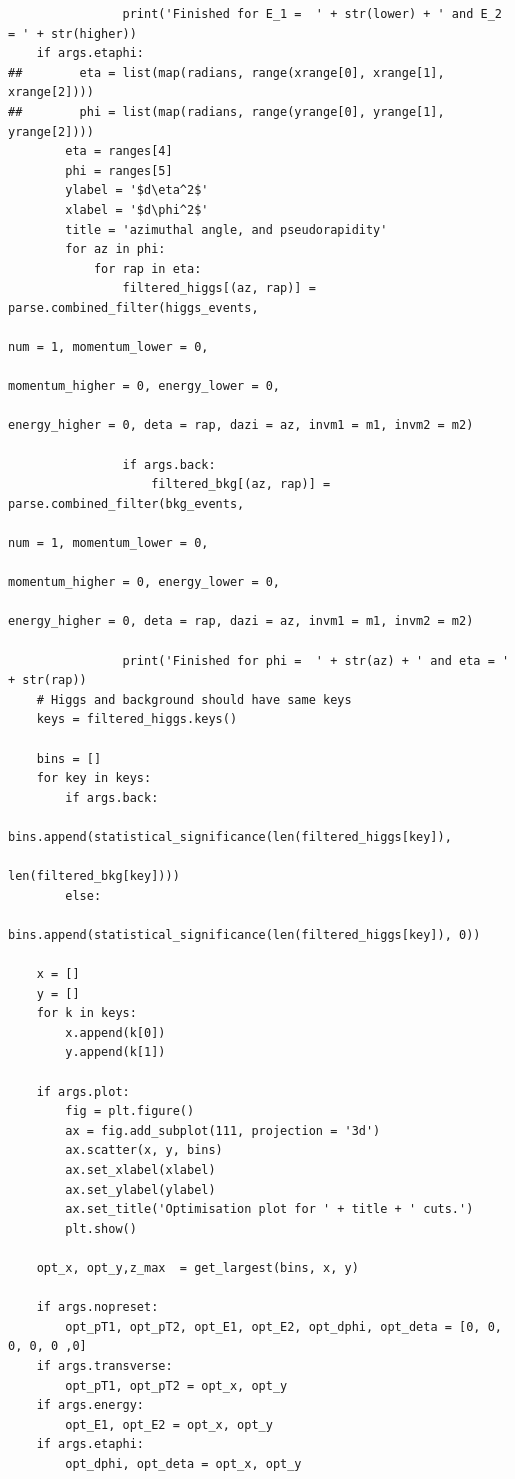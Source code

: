 \documentclass{article}
\begin{document}
\begin{lstlisting}
                print('Finished for E_1 =  ' + str(lower) + ' and E_2 = ' + str(higher))
    if args.etaphi:
##        eta = list(map(radians, range(xrange[0], xrange[1], xrange[2])))
##        phi = list(map(radians, range(yrange[0], yrange[1], yrange[2])))
        eta = ranges[4]
        phi = ranges[5]
        ylabel = '$d\eta^2$'
        xlabel = '$d\phi^2$'
        title = 'azimuthal angle, and pseudorapidity'
        for az in phi:
            for rap in eta:
                filtered_higgs[(az, rap)] = parse.combined_filter(higgs_events,
                                                                        num = 1, momentum_lower = 0,
                                                                        momentum_higher = 0, energy_lower = 0,
                                                                        energy_higher = 0, deta = rap, dazi = az, invm1 = m1, invm2 = m2)

                if args.back:
                    filtered_bkg[(az, rap)] = parse.combined_filter(bkg_events,
                                                                     num = 1, momentum_lower = 0,
                                                                     momentum_higher = 0, energy_lower = 0,
                                                                     energy_higher = 0, deta = rap, dazi = az, invm1 = m1, invm2 = m2)

                print('Finished for phi =  ' + str(az) + ' and eta = ' + str(rap))
    # Higgs and background should have same keys
    keys = filtered_higgs.keys()

    bins = []
    for key in keys:
        if args.back:
            bins.append(statistical_significance(len(filtered_higgs[key]),
                                                 len(filtered_bkg[key])))
        else:
            bins.append(statistical_significance(len(filtered_higgs[key]), 0))

    x = []
    y = []
    for k in keys:
        x.append(k[0])
        y.append(k[1])

    if args.plot:
        fig = plt.figure()
        ax = fig.add_subplot(111, projection = '3d')
        ax.scatter(x, y, bins)
        ax.set_xlabel(xlabel)
        ax.set_ylabel(ylabel)
        ax.set_title('Optimisation plot for ' + title + ' cuts.')
        plt.show()

    opt_x, opt_y,z_max  = get_largest(bins, x, y)

    if args.nopreset:
        opt_pT1, opt_pT2, opt_E1, opt_E2, opt_dphi, opt_deta = [0, 0, 0, 0, 0 ,0]
    if args.transverse:
        opt_pT1, opt_pT2 = opt_x, opt_y
    if args.energy:
        opt_E1, opt_E2 = opt_x, opt_y
    if args.etaphi:
        opt_dphi, opt_deta = opt_x, opt_y


\end{lstlisting}
\end{document}
